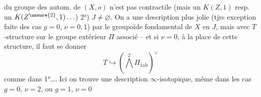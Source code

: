  du groupe des autom. de $(X,o)$
n'est pas contractile (mais un
$K(Z,1)$ resp. un $K(Z^{\unsure{2}},1)\ldots$)
2°) $J\ne\varnothing$. On a une description
plus jolie (tjrs exception faite
des cas $g=0$, $\nu=0,1$) par le
groupoïde fondamental de $X$
en $J$, mais avec $T$-structure
 sur le groupe extérieur
$\Pi$ associé -- et si $\nu=0$, à la place de
cette structure, il faut se donner
\[T\hookrightarrow(\bigwedge^2\Pi_{1\mathrm{ab}})^\vee\]
comme dans 1°\ldots. Ici on trouve
une description $\infty$-isotopique, même
dans les cas $g=0$, $\nu=2$, ou $g=1$, $\nu=0$
